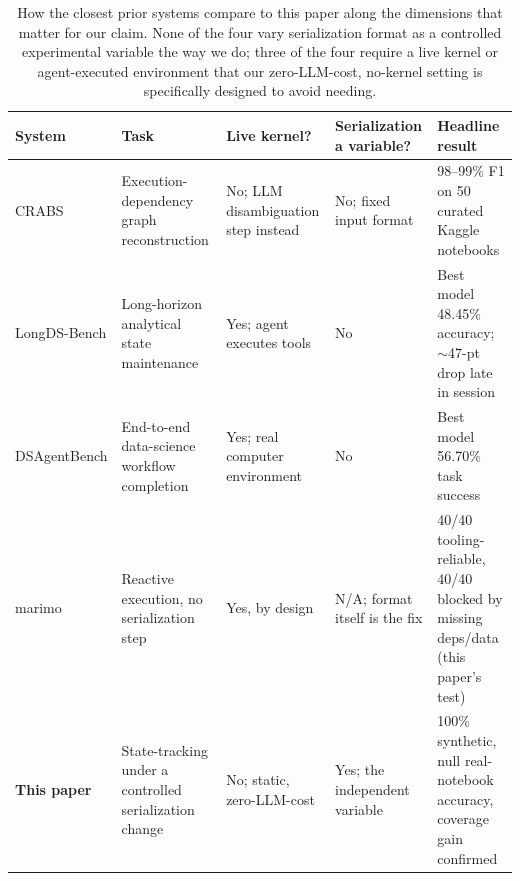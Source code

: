 \documentclass[11pt]{article}
\begin{document}
\begin{table}[t]
\centering\small
\begin{tabular}{@{}p{2.4cm}p{2.5cm}p{2.0cm}p{2.0cm}p{3.1cm}@{}}
\toprule
System & Task & Live kernel? & Serialization a variable? & Headline result \\
\midrule
CRABS \citep{li2025crabs} & Execution-dependency graph reconstruction & No; LLM disambiguation step instead & No; fixed input format & 98--99\% F1 on 50 curated Kaggle notebooks \\
LongDS-Bench \citep{xu2026longds} & Long-horizon analytical state maintenance & Yes; agent executes tools & No & Best model 48.45\% accuracy; $\sim$47-pt drop late in session \\
DSAgentBench \citep{rahman2026dsagentbench} & End-to-end data-science workflow completion & Yes; real computer environment & No & Best model 56.70\% task success \\
marimo \citep{marimo} & Reactive execution, no serialization step & Yes, by design & N/A; format itself is the fix & 40/40 tooling-reliable, 40/40 blocked by missing deps/data (this paper's test) \\
\textbf{This paper} & State-tracking under a controlled serialization change & No; static, zero-LLM-cost & Yes; the independent variable & 100\% synthetic, null real-notebook accuracy, coverage gain confirmed \\
\bottomrule
\end{tabular}
\caption{How the closest prior systems compare to this paper along the
dimensions that matter for our claim. None of the four vary serialization
format as a controlled experimental variable the way we do; three of the
four require a live kernel or agent-executed environment that our
zero-LLM-cost, no-kernel setting is specifically designed to avoid
needing.}
\label{tab:relwork}
\end{table}
\end{document}
